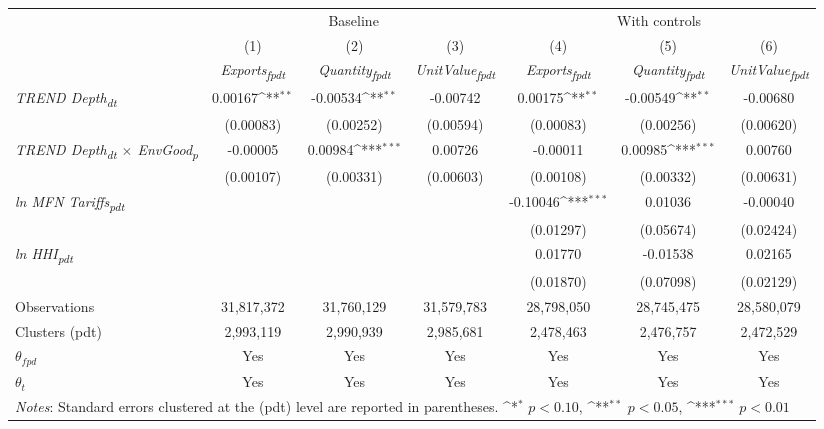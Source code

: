 {
\def\sym#1{\ifmmode^{#1}\else\(^{#1}\)\fi}
\begin{tabular}{l*{6}{c}}
\toprule
&\multicolumn{3}{c}{Baseline}&\multicolumn{3}{c}{With controls}\\\cmidrule(lr){2-4}\cmidrule(lr){5-7}
&(1)&(2)&(3)&(4)&(5)&(6)\\
&\textit{Exports\textsubscript{fpdt}}&\textit{Quantity\textsubscript{fpdt}}&\textit{UnitValue\textsubscript{fpdt}}&\textit{Exports\textsubscript{fpdt}}&\textit{Quantity\textsubscript{fpdt}}&\textit{UnitValue\textsubscript{fpdt}}\\
\midrule
\textit{TREND Depth\textsubscript{dt}} & 0.00167\sym{**} & -0.00534\sym{**} & -0.00742 & 0.00175\sym{**} & -0.00549\sym{**} & -0.00680\\
  & (0.00083) & (0.00252) & (0.00594) & (0.00083) & (0.00256) & (0.00620)\\
\addlinespace
\textit{TREND Depth\textsubscript{dt} $\times$ EnvGood\textsubscript{p}} & -0.00005 & 0.00984\sym{***} & 0.00726 & -0.00011 & 0.00985\sym{***} & 0.00760\\
  & (0.00107) & (0.00331) & (0.00603) & (0.00108) & (0.00332) & (0.00631)\\
\addlinespace
\textit{ln MFN Tariffs\textsubscript{pdt}} &  &  &  & -0.10046\sym{***} & 0.01036 & -0.00040\\
  &  &  &  & (0.01297) & (0.05674) & (0.02424)\\
\addlinespace
\textit{ln HHI\textsubscript{pdt}} &  &  &  & 0.01770 & -0.01538 & 0.02165\\
  &  &  &  & (0.01870) & (0.07098) & (0.02129)\\
\midrule
Observations & 31,817,372 & 31,760,129 & 31,579,783 & 28,798,050 & 28,745,475 & 28,580,079\\
Clusters (pdt) & 2,993,119 & 2,990,939 & 2,985,681 & 2,478,463 & 2,476,757 & 2,472,529\\
$\theta_{fpd}$ & Yes & Yes & Yes & Yes & Yes & Yes\\
$\theta_{t}$ & Yes & Yes & Yes & Yes & Yes & Yes\\
\bottomrule
\multicolumn{7}{l}{\footnotesize \textit{Notes}: Standard errors clustered at the (pdt) level are reported in parentheses. \sym{*} \(p<0.10\), \sym{**} \(p<0.05\), \sym{***} \(p<0.01\)}\\
\end{tabular}
}
